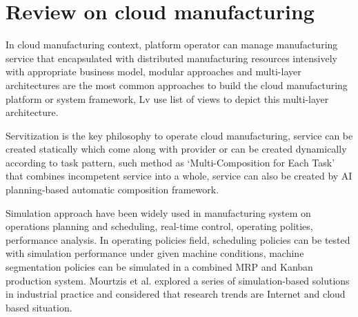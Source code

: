 \section{Review on cloud manufacturing} %
\label{sec:literature_review}


In cloud manufacturing context, platform operator can manage  manufacturing service that encapsulated with distributed manufacturing resources intensively with appropriate business model\cite{Xu2012}, modular approaches and multi-layer architectures are the most common approaches to build the cloud manufacturing platform or system framework\cite{Tao2012,Valilai2013}, Lv use list of views to depict this multi-layer architecture\cite{LvJuly312012-Aug.22012}. 

Servitization is the key philosophy to operate cloud manufacturing\cite{li2010cloud}, service can be created statically which come along with provider\cite{Tao2012} or can be created dynamically according to task pattern, such method as `Multi-Composition for Each Task'\cite{Liu2013} that combines incompetent service into a whole, service can also be created by AI planning-based automatic composition framework\cite{OhJan.-March2008}. 

Simulation approach have been widely used in manufacturing system on operations planning and scheduling, real-time control, operating polities, performance analysis\cite{Smith2003}. In operating policies field, scheduling policies can be tested with simulation performance under given machine conditions\cite{Sabuncuoglu2003}, machine
segmentation policies can be simulated in a combined MRP and Kanban production system\cite{Felberbauer9-12Dec.2012}. Mourtzis et al.\cite{Mourtzis2015} explored a series of simulation-based solutions in industrial practice and considered that research trends are Internet and cloud based situation.


